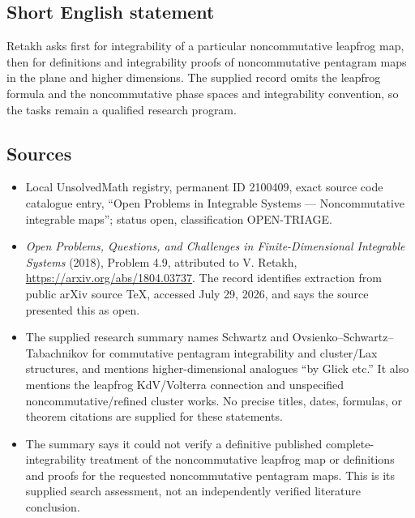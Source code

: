 \documentclass[11pt]{article}
\begin{document}
\subsection{Short English statement}
Retakh asks first for integrability of a particular noncommutative leapfrog map, then for definitions and integrability proofs of noncommutative pentagram maps in the plane and higher dimensions. The supplied record omits the leapfrog formula and the noncommutative phase spaces and integrability convention, so the tasks remain a qualified research program.
\subsection{Sources}
\begin{itemize}
\item Local UnsolvedMath registry, permanent ID 2100409, exact source code catalogue entry, ``Open Problems in Integrable Systems --- Noncommutative integrable maps''; status open, classification OPEN-TRIAGE.
\item \emph{Open Problems, Questions, and Challenges in Finite-Dimensional Integrable Systems} (2018), Problem 4.9, attributed to V. Retakh, \url{https://arxiv.org/abs/1804.03737}. The record identifies extraction from public arXiv source TeX, accessed July 29, 2026, and says the source presented this as open.
\item The supplied research summary names Schwartz and Ovsienko--Schwartz--Tabachnikov for commutative pentagram integrability and cluster/Lax structures, and mentions higher-dimensional analogues ``by Glick etc.'' It also mentions the leapfrog KdV/Volterra connection and unspecified noncommutative/refined cluster works. No precise titles, dates, formulas, or theorem citations are supplied for these statements.
\item The summary says it could not verify a definitive published complete-integrability treatment of the noncommutative leapfrog map or definitions and proofs for the requested noncommutative pentagram maps. This is its supplied search assessment, not an independently verified literature conclusion.
\end{itemize}
\end{document}
